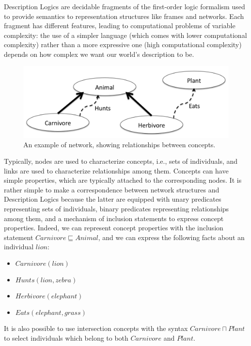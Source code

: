 \documentclass[a4paper, 11pt, oneside]{duthesis}
\begin{document}
Description Logics are decidable fragments of the first-order logic formalism used to provide semantics to representation structures like frames and networks.
Each fragment has different features, leading to computational problems of variable complexity: the use of a simpler language (which comes with lower computational complexity) rather than a more expressive one (high computational complexity) depends on how complex we want our world's description to be.


\begin{figure}[htp]
\centering
\includegraphics[scale=.33]{img/relationship_network.png}
\caption{An example of network, showing relationships between concepts.}
\label{rel_net}
\end{figure}

Typically, nodes are used to characterize concepts, i.e., sets of individuals, and links are used to characterize relationships among them.
Concepts can have simple properties, which are typically attached to the corresponding nodes.
It is rather simple to make a correspondence between network structures and Description Logics because the latter are equipped with unary predicates representing sets of individuals, binary predicates representing relationships among them, and a mechanism of inclusion statements to express concept properties.
Indeed, we can represent concept properties with the inclusion statement $Carnivore \sqsubseteq Animal$, and we can express the following facts about an individual $lion$: 

\begin{itemize}
	\item $Carnivore(lion)$
	\item $Hunts(lion, zebra)$
	\item $Herbivore(elephant)$
	\item $Eats(elephant, grass)$
\end{itemize}

It is also possible to use intersection concepts with the syntax $Carnivore \sqcap Plant$ to select individuals which belong to both $Carnivore$ and $Plant$.
\end{document}
